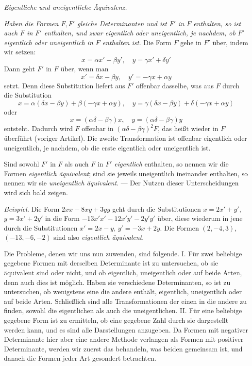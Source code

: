 \begin{center}
\textit{Eigentliche und uneigentliche Äquivalenz.}
\end{center}

\textit{Haben die Formen $F,F'$ gleiche Determinanten und ist $F'$ in $F$ enthalten, so ist auch $F$ in $F'$ enthalten, und zwar eigentlich oder uneigentlich, je nachdem, ob $F'$ eigentlich oder uneigentlich in $F$ enthalten ist.} Die Form $F$ gehe in $F'$ über, indem wir setzen:
\[
x=\alpha x'+\beta y',\quad y=\gamma x'+\delta y'
\]
Dann geht $F'$ in $F$ über, wenn man
\[
x'=\delta x-\beta y,\quad y'=-\gamma x+\alpha y
\]
setzt. Denn diese Substitution liefert aus $F'$ offenbar dasselbe, was aus $F$ durch die Substitution
\[
x=\alpha(\delta x-\beta y)+\beta(-\gamma x+\alpha y),\quad
y=\gamma(\delta x-\beta y)+\delta(-\gamma x+\alpha y)
\]
oder
\[
x=(\alpha\delta-\beta\gamma)x,\quad y=(\alpha\delta-\beta\gamma)y
\]
entsteht. Dadurch wird $F$ offenbar in $(\alpha\delta-\beta\gamma)^2F$, das heißt wieder in $F$ überführt (voriger Artikel). Die zweite Transformation ist offenbar eigentlich oder uneigentlich, je nachdem, ob die erste eigentlich oder uneigentlich ist.

Sind sowohl $F'$ in $F$ als auch $F$ in $F'$ \textit{eigentlich} enthalten, so nennen wir die Formen \textit{eigentlich äquivalent}; sind sie jeweils uneigentlich ineinander enthalten, so nennen wir sie \textit{uneigentlich äquivalent}. --- Der Nutzen dieser Unterscheidungen wird sich bald zeigen.

\textit{Beispiel.} Die Form $2xx-8xy+3yy$ geht durch die Substitutionen $x=2x'+y'$, $y=3x'+2y'$ in die Form $-13x'x'-12x'y'-2y'y'$ über, diese wiederum in jene durch die Substitutionen $x'=2x-y$, $y'=-3x+2y$. Die Formen $(2,-4,3)$, $(-13,-6,-2)$ sind also \textit{eigentlich äquivalent}.

Die Probleme, denen wir uns nun zuwenden, sind folgende. I. Für zwei beliebige gegebene Formen mit derselben Determinante ist zu untersuchen, ob sie äquivalent sind oder nicht, und ob eigentlich, uneigentlich oder auf beide Arten, denn auch dies ist möglich. Haben sie verschiedene Determinanten, so ist zu untersuchen, ob wenigstens eine die andere enthält, eigentlich, uneigentlich oder auf beide Arten. Schließlich sind alle Transformationen der einen in die andere zu finden, sowohl die eigentlichen als auch die uneigentlichen. II. Für eine beliebige gegebene Form ist zu ermitteln, ob eine gegebene Zahl durch sie dargestellt werden kann, und es sind alle Darstellungen anzugeben. Da Formen mit negativer Determinante hier aber eine andere Methode verlangen als Formen mit positiver Determinante, werden wir zuerst das behandeln, was beiden gemeinsam ist, und danach die Formen jeder Art gesondert betrachten.
